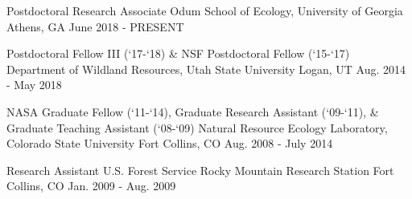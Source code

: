 

\begin{cventries}

  \eduentry
    {Postdoctoral Research Associate} %
    {Odum School of Ecology, University of Georgia} %
    {Athens, GA} %
    {June 2018 - PRESENT} %

  \eduentry
    {Postdoctoral Fellow III (`17-`18) \& NSF Postdoctoral Fellow (`15-`17)} %
    {Department of Wildland Resources, Utah State University} %
    {Logan, UT} %
    {Aug. 2014 - May 2018} %

  \eduentry
    {NASA Graduate Fellow (`11-`14), Graduate Research Assistant (`09-`11), \& Graduate Teaching Assistant (`08-`09)} %
    {Natural Resource Ecology Laboratory, Colorado State University} %
    {Fort Collins, CO} %
    {Aug. 2008 - July 2014} %

  \eduentry
    {Research Assistant} %
    {U.S. Forest Service Rocky Mountain Research Station} %
    {Fort Collins, CO} %
    {Jan. 2009 - Aug. 2009} %

\end{cventries}
